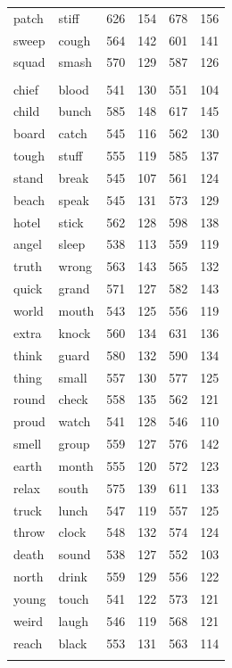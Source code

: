 \documentclass[
]{interact}
\begin{document}
\begin{longtable*}{llrrrr}
patch & stiff & 626 & 154 & 678 & 156 \\ 
sweep & cough & 564 & 142 & 601 & 141 \\ 
squad & smash & 570 & 129 & 587 & 126 \\ 
\midrule\addlinespace[2.5pt]
 \\ 
\midrule\addlinespace[2.5pt]
chief & blood & 541 & 130 & 551 & 104 \\ 
child & bunch & 585 & 148 & 617 & 145 \\ 
board & catch & 545 & 116 & 562 & 130 \\ 
tough & stuff & 555 & 119 & 585 & 137 \\ 
stand & break & 545 & 107 & 561 & 124 \\ 
beach & speak & 545 & 131 & 573 & 129 \\ 
hotel & stick & 562 & 128 & 598 & 138 \\ 
angel & sleep & 538 & 113 & 559 & 119 \\ 
truth & wrong & 563 & 143 & 565 & 132 \\ 
quick & grand & 571 & 127 & 582 & 143 \\ 
world & mouth & 543 & 125 & 556 & 119 \\ 
extra & knock & 560 & 134 & 631 & 136 \\ 
think & guard & 580 & 132 & 590 & 134 \\ 
thing & small & 557 & 130 & 577 & 125 \\ 
round & check & 558 & 135 & 562 & 121 \\ 
proud & watch & 541 & 128 & 546 & 110 \\ 
smell & group & 559 & 127 & 576 & 142 \\ 
earth & month & 555 & 120 & 572 & 123 \\ 
relax & south & 575 & 139 & 611 & 133 \\ 
truck & lunch & 547 & 119 & 557 & 125 \\ 
throw & clock & 548 & 132 & 574 & 124 \\ 
death & sound & 538 & 127 & 552 & 103 \\ 
north & drink & 559 & 129 & 556 & 122 \\ 
young & touch & 541 & 122 & 573 & 121 \\ 
weird & laugh & 546 & 119 & 568 & 121 \\ 
reach & black & 553 & 131 & 563 & 114 \\ 
\midrule\addlinespace[2.5pt]
 \\ 

\end{longtable*}
\end{document}
